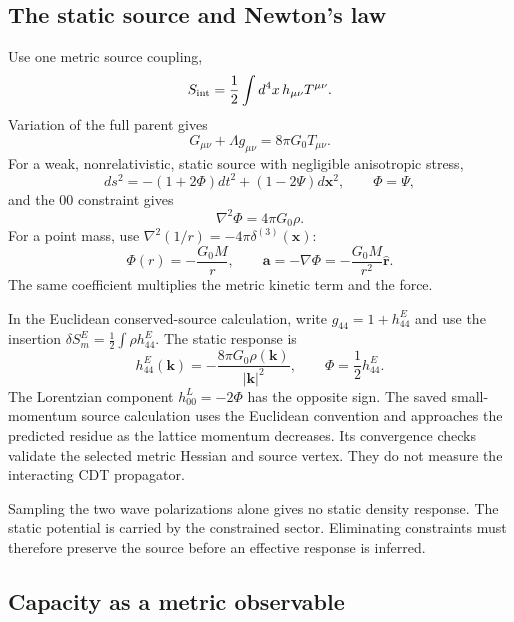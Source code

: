 \subsection{The static source and Newton's law}

Use one metric source coupling,
\begin{equation}
S_{\rm int}=\frac12\int d^4x\,h_{\mu\nu}T^{\mu\nu}.
\end{equation}
Variation of the full parent gives
\begin{equation}
G_{\mu\nu}+\Lambda g_{\mu\nu}=8\pi G_0T_{\mu\nu}.
\label{eq:einstein}
\end{equation}
For a weak, nonrelativistic, static source with negligible anisotropic stress,
\begin{equation}
ds^2=-(1+2\Phi)dt^2+(1-2\Psi)d\mathbf x^2,\qquad
\Phi=\Psi,
\end{equation}
and the $00$ constraint gives
\begin{equation}
\nabla^2\Phi=4\pi G_0\rho.
\end{equation}
For a point mass, use $\nabla^2(1/r)=-4\pi\delta^{(3)}(\mathbf x)$:
\begin{equation}
\Phi(r)=-\frac{G_0M}{r},\qquad
\mathbf a=-\nabla\Phi=-\frac{G_0M}{r^2}\widehat{\mathbf r}.
\label{eq:newton}
\end{equation}
The same coefficient multiplies the metric kinetic term and the force.

In the Euclidean conserved-source calculation, write $g_{44}=1+h_{44}^{E}$ and use the insertion $\delta S_m^E=\tfrac12\int \rho h_{44}^{E}$. The static response is
\begin{equation}
h_{44}^{E}(\mathbf k)=-\frac{8\pi G_0\rho(\mathbf k)}{|\mathbf k|^2},
\qquad \Phi=\frac12h_{44}^{E}.
\end{equation}
The Lorentzian component $h_{00}^{L}=-2\Phi$ has the opposite sign. The saved small-momentum source calculation uses the Euclidean convention and approaches the predicted residue as the lattice momentum decreases. Its convergence checks validate the selected metric Hessian and source vertex. They do not measure the interacting CDT propagator.

Sampling the two wave polarizations alone gives no static density response. The static potential is carried by the constrained sector. Eliminating constraints must therefore preserve the source before an effective response is inferred.

\subsection{Capacity as a metric observable}


